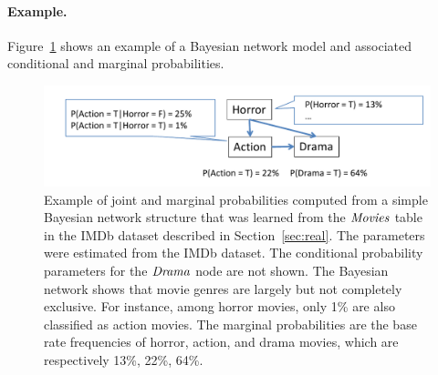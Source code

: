 {{\paragraph{Example.} Figure~\ref{fig:bn-imdb} shows an example of a Bayesian network model and associated conditional and marginal probabilities. 

\begin{figure}[t]
 		\centering
 		\includegraphics[width=1\textwidth] 
 		{movie-bn.pdf}
 		\caption[Example of conidtional and marginal probabilities computed from a toy Bayesian network structure. ]{Example of joint and marginal probabilities computed from a simple Bayesian network structure that was learned from the $\it{Movies}$ table in the IMDb dataset described in Section~\ref{sec:real}. The parameters were estimated from the  IMDb dataset. The conditional probability parameters for the $\it{Drama}$ node are not shown. The Bayesian  network shows that movie genres are largely but not completely exclusive. For instance, among horror movies, only 1\% are also classified as action movies. The marginal probabilities are the base rate frequencies of horror, action, and drama movies, which are respectively 13\%, 22\%, 64\%.
 			\label{fig:bn-imdb}
 		}
 	\end{figure}


%

%				
%				
%				
%				

%					
%					

}}
